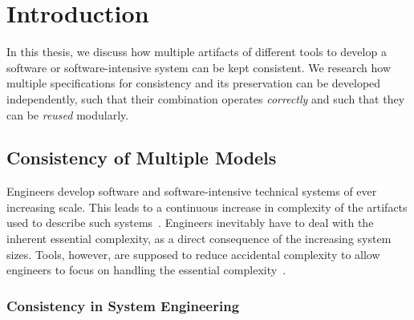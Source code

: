 \chapter{Introduction
}
\label{chap:introduction}

In this thesis, we discuss how multiple artifacts of different tools to develop a software or software-intensive system can be kept consistent.
We research how multiple specifications for consistency and its preservation can be developed independently, such that their combination operates \emph{correctly} and such that they can be \emph{reused} modularly.



\section{Consistency of Multiple Models}

Engineers develop software and software-intensive technical systems of ever increasing scale.
This leads to a continuous increase in complexity of the artifacts used to describe such systems~\cite{murer2011evolution}.
Engineers inevitably have to deal with the inherent essential complexity, as a direct consequence of the increasing system sizes.
Tools, however, are supposed to reduce accidental complexity to allow engineers to focus on handling the essential complexity~\cite{brooks1987NoSilverBullet-Computer, fraser2008NoSilverBulletReloaded-Software}.

\subsection{Consistency in System Engineering}


